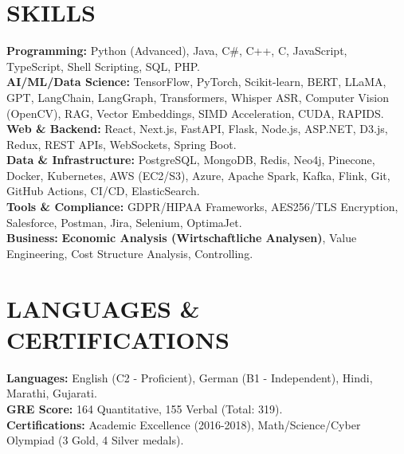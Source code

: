 \documentclass[a4paper,10pt]{article}
\begin{document}
\section{SKILLS}
\noindent
\textbf{Programming:} Python (Advanced), Java, C\#, C++, C, JavaScript, TypeScript, Shell Scripting, SQL, PHP. \\
\textbf{AI/ML/Data Science:} TensorFlow, PyTorch, Scikit-learn, BERT, LLaMA, GPT, LangChain, LangGraph, Transformers, Whisper ASR, Computer Vision (OpenCV), RAG, Vector Embeddings, SIMD Acceleration, CUDA, RAPIDS. \\
\textbf{Web \& Backend:} React, Next.js, FastAPI, Flask, Node.js, ASP.NET, D3.js, Redux, REST APIs, WebSockets, Spring Boot. \\
\textbf{Data \& Infrastructure:} PostgreSQL, MongoDB, Redis, Neo4j, Pinecone, Docker, Kubernetes, AWS (EC2/S3), Azure, Apache Spark, Kafka, Flink, Git, GitHub Actions, CI/CD, ElasticSearch. \\
\textbf{Tools \& Compliance:} GDPR/HIPAA Frameworks, AES256/TLS Encryption, Salesforce, Postman, Jira, Selenium, OptimaJet. \\
\textbf{Business:} \textbf{Economic Analysis (Wirtschaftliche Analysen)}, Value Engineering, Cost Structure Analysis, Controlling.

\section{LANGUAGES \& CERTIFICATIONS}
\noindent
\textbf{Languages:} English (C2 - Proficient), German (B1 - Independent), Hindi, Marathi, Gujarati. \\
\textbf{GRE Score:} 164 Quantitative, 155 Verbal (Total: 319). \\
\textbf{Certifications:} Academic Excellence (2016-2018), Math/Science/Cyber Olympiad (3 Gold, 4 Silver medals).
\end{document}
